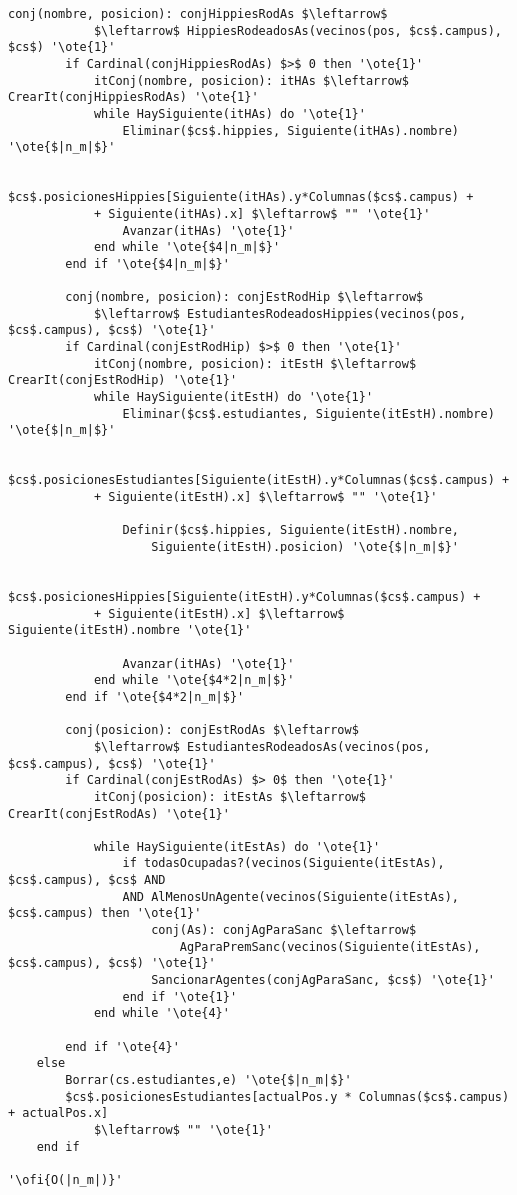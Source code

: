 \begin{lstlisting}[mathescape]
		conj(nombre, posicion): conjHippiesRodAs $\leftarrow$
			$\leftarrow$ HippiesRodeadosAs(vecinos(pos, $cs$.campus), $cs$) '\ote{1}'
		if Cardinal(conjHippiesRodAs) $>$ 0 then '\ote{1}'
			itConj(nombre, posicion): itHAs $\leftarrow$ CrearIt(conjHippiesRodAs) '\ote{1}'
			while HaySiguiente(itHAs) do '\ote{1}'
				Eliminar($cs$.hippies, Siguiente(itHAs).nombre) '\ote{$|n_m|$}'

				$cs$.posicionesHippies[Siguiente(itHAs).y*Columnas($cs$.campus) +
			+ Siguiente(itHAs).x] $\leftarrow$ "" '\ote{1}'
				Avanzar(itHAs) '\ote{1}'
			end while '\ote{$4|n_m|$}'
		end if '\ote{$4|n_m|$}'

		conj(nombre, posicion): conjEstRodHip $\leftarrow$
			$\leftarrow$ EstudiantesRodeadosHippies(vecinos(pos, $cs$.campus), $cs$) '\ote{1}'
		if Cardinal(conjEstRodHip) $>$ 0 then '\ote{1}'
			itConj(nombre, posicion): itEstH $\leftarrow$ CrearIt(conjEstRodHip) '\ote{1}'
			while HaySiguiente(itEstH) do '\ote{1}'
				Eliminar($cs$.estudiantes, Siguiente(itEstH).nombre) '\ote{$|n_m|$}'

				$cs$.posicionesEstudiantes[Siguiente(itEstH).y*Columnas($cs$.campus) +
			+ Siguiente(itEstH).x] $\leftarrow$ "" '\ote{1}'

				Definir($cs$.hippies, Siguiente(itEstH).nombre,
					Siguiente(itEstH).posicion) '\ote{$|n_m|$}'

				$cs$.posicionesHippies[Siguiente(itEstH).y*Columnas($cs$.campus) +
			+ Siguiente(itEstH).x] $\leftarrow$ Siguiente(itEstH).nombre '\ote{1}'

				Avanzar(itHAs) '\ote{1}'
			end while '\ote{$4*2|n_m|$}'
		end if '\ote{$4*2|n_m|$}'

		conj(posicion): conjEstRodAs $\leftarrow$
			$\leftarrow$ EstudiantesRodeadosAs(vecinos(pos, $cs$.campus), $cs$) '\ote{1}'
		if Cardinal(conjEstRodAs) $> 0$ then '\ote{1}'
			itConj(posicion): itEstAs $\leftarrow$ CrearIt(conjEstRodAs) '\ote{1}'

			while HaySiguiente(itEstAs) do '\ote{1}'
				if todasOcupadas?(vecinos(Siguiente(itEstAs), $cs$.campus), $cs$ AND
				AND AlMenosUnAgente(vecinos(Siguiente(itEstAs), $cs$.campus) then '\ote{1}'
					conj(As): conjAgParaSanc $\leftarrow$ 
						AgParaPremSanc(vecinos(Siguiente(itEstAs), $cs$.campus), $cs$) '\ote{1}'
					SancionarAgentes(conjAgParaSanc, $cs$) '\ote{1}'
				end if '\ote{1}'
			end while '\ote{4}'

		end if '\ote{4}'
	else
		Borrar(cs.estudiantes,e) '\ote{$|n_m|$}'
		$cs$.posicionesEstudiantes[actualPos.y * Columnas($cs$.campus) + actualPos.x] 
			$\leftarrow$ "" '\ote{1}'
	end if

'\ofi{O(|n_m|)}'
\end{lstlisting}

